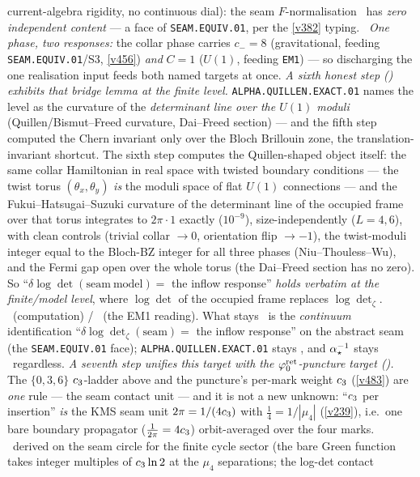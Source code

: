 current-algebra rigidity, no continuous dial): the seam $F$-normalisation \mC\ has \emph{zero independent
content} --- a face of \texttt{SEAM.EQUIV.01}, per the \vref{v382} typing. \mC\ \emph{One phase, two
responses:} the collar phase carries $c_-=8$ (gravitational, feeding \texttt{SEAM.EQUIV.01}/S3, \vref{v456})
\emph{and} $C=1$ ($U(1)$, feeding \texttt{EM1}) --- so discharging the one realisation input feeds both named
targets at once.
\emph{A sixth honest step () exhibits that bridge lemma at the finite
level.} \texttt{ALPHA.QUILLEN.EXACT.01} names the level as the curvature of the \emph{determinant line over
the $U(1)$ moduli} (Quillen/Bismut--Freed curvature, Dai--Freed section) --- and the fifth step computed the
Chern invariant only over the Bloch Brillouin zone, the translation-invariant shortcut. The sixth step
computes the Quillen-shaped object itself: the same collar Hamiltonian in real space with twisted boundary
conditions --- the twist torus $(\theta_x,\theta_y)$ \emph{is} the moduli space of flat $U(1)$ connections
--- and the Fukui--Hatsugai--Suzuki curvature of the determinant line of the occupied frame over that torus
integrates to $2\pi\cdot 1$ exactly ($10^{-9}$), size-independently ($L=4,6$), with clean controls (trivial
collar $\to 0$, orientation flip $\to -1$), the twist-moduli integer equal to the Bloch-BZ integer for all
three phases (Niu--Thouless--Wu), and the Fermi gap open over the whole torus (the Dai--Freed section has no
zero). So ``$\delta\log\det(\mathrm{seam~model})=$ the inflow response'' \emph{holds verbatim at the
finite/model level}, where $\log\det$ of the occupied frame replaces $\log\det_\zeta$. \mE\ (computation) /
\mC\ (the EM1 reading). What stays \mO\ is the \emph{continuum} identification
``$\delta\log\det_\zeta(\mathrm{seam})=$ the inflow response'' on the abstract seam (the
\texttt{SEAM.EQUIV.01} face); \texttt{ALPHA.QUILLEN.EXACT.01} stays \mO, and $\alpha^{-1}_\star$ stays \mE\ regardless.
\emph{A seventh step unifies this target with the $\varphi_0^{\mathrm{ret}}$-puncture target
().} The $\{0,3,6\}$ $c_3$-ladder above and the puncture's per-mark
weight $c_3$ (\vref{v483}) are \emph{one} rule --- the seam contact unit --- and it is not a new
unknown: ``$c_3$ per insertion'' \emph{is} the KMS seam unit $2\pi=1/(4c_3)$ with
$\tfrac14=1/|\mu_4|$ (\vref{v239}), i.e.\ one bare boundary propagator ($\tfrac1{2\pi}=4c_3$)
orbit-averaged over the four marks. \mE\ derived on the seam circle for the finite cycle sector (the bare
Green function takes integer multiples of $c_3\ln2$ at the $\mu_4$ separations; the log-det contact
